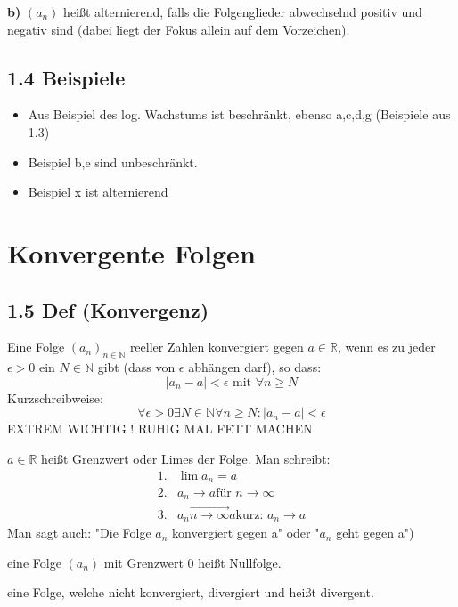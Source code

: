 \documentclass[12pt]{article}
\begin{document}
\textbf{b)}
 $(a_n)$ heißt alternierend, falls die Folgenglieder abwechselnd positiv und negativ sind (dabei liegt der Fokus allein auf dem Vorzeichen).
 
\subsection*{1.4 Beispiele}

	\begin{itemize}		
			\item Aus Beispiel des log. Wachstums ist beschränkt, ebenso a,c,d,g (Beispiele aus 1.3)
			\item Beispiel b,e sind unbeschränkt.
			\item Beispiel x ist alternierend
	\end{itemize}


\section*{Konvergente Folgen}
\subsection*{1.5 Def (Konvergenz)}
\begin{compactenum}[\bfseries a)]
	\item Eine Folge $(a_n)_{n\in\mathbb{N}}$ reeller Zahlen konvergiert gegen $a\in \mathbb{R}$, wenn es zu jeder $\epsilon > 0$ ein $N\in \mathbb{N}$ gibt (dass von $\epsilon$ abhängen darf), so dass: 
	$$| a_n - a| < \epsilon \text{  mit  } \forall n \geq N$$
	Kurzschreibweise: 
	$$ \forall \epsilon > 0 \exists N \in \mathbb{N}\forall n \geq N : |a_n - a| < \epsilon$$
	{\Large EXTREM WICHTIG ! RUHIG MAL FETT MACHEN}
	\item $a\in \mathbb{R}$ heißt Grenzwert oder Limes der Folge. Man schreibt: \\
	\begin{align*}
	\text{1.}& \lim a_n = a\\
	\text{2.}& a_n \rightarrow a \text{für } n \rightarrow \infty\\
	\text{3.}& a_n \overrightarrow{n 	\rightarrow \infty } a \text{kurz: } a_n \rightarrow a
	\end{align*}
	Man sagt auch: "Die Folge $a_n$ konvergiert gegen a" oder "$a_n$ geht gegen a")\\
	\item eine Folge $(a_n)$ mit Grenzwert 0 heißt Nullfolge. \\
	\item eine Folge, welche nicht konvergiert, divergiert und heißt divergent. 
	\end{compactenum}
\end{document}
